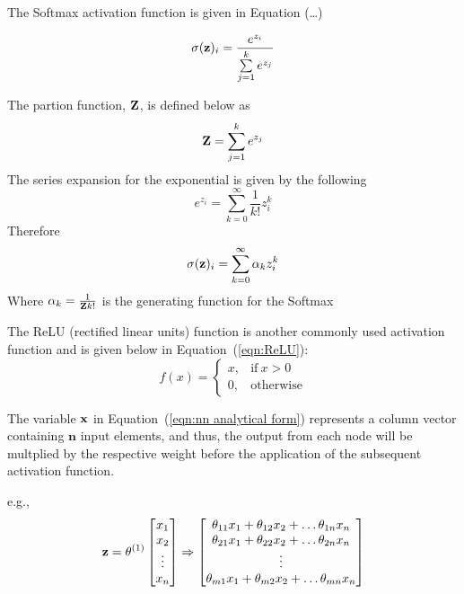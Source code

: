 The Softmax activation function is given in Equation (\ldots)

\begin{equation}
	\sigma(\bold z)_i =
	\frac{e^{z_i}}{\sum\limits_{j=1}^k e^{z_j}}
\end{equation}

The partion function, $\bold Z$, is defined below as
\begin{equation}
	\bold Z = \sum\limits_{j=1}^k e^{z_j}
\end{equation}
The series expansion for the exponential is given by the following
\begin{equation}
	e^{z_{i}} = \sum_{k=0}^{\infty}\frac{1}{k!} z_{i}^{k}
\end{equation}
Therefore
\begin{equation}
	\sigma(\bold z)_i = 
	\sum\limits_{k=0}^{\infty} \alpha_{k}z_{i}^{k}
\end{equation}
Where $\alpha_k = \frac{1}{{\bold Z}k!}$ is the generating function for the Softmax


The ReLU (rectified linear units) function is another commonly used activation function and is given below in Equation~(\ref{eqn:ReLU}):
\begin{equation}
	f(x) =
	\begin{cases}
		x, & \text{if}\ x > 0 \\
		0, & \text{otherwise}
	\end{cases}
	\label{eqn:ReLU}
\end{equation}

The variable $\bold x$ in Equation~(\ref{eqn:nn analytical form}) represents a column vector containing $\boldsymbol n$ input elements, and thus, the output from each node will be multplied by the respective weight before the application of the subsequent activation function.

e.g.,
\begin{equation}
	\bold z =
	\theta^{(1)} \begin{bmatrix}
				x_{1} \\
				x_{2} \\
				\vdots \\
				x_{n}
			\end{bmatrix}
	\Rightarrow \begin{bmatrix}
					\theta_{11} x_{1} + \theta_{12} x_{2} + \ldots \theta_{1n} x_{n} \\
					\theta_{21} x_{1} + \theta_{22} x_{2} + \ldots \theta_{2n} x_{n} \\
					\vdots \\
					\theta_{m1} x_{1} + \theta_{m2} x_{2} + \ldots \theta_{mn} x_{n} \\
				\end{bmatrix}
\end{equation}

